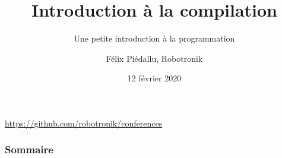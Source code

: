 \documentclass[8pt,a9paper]{beamer}
\title{Introduction à la compilation}
\subtitle{Une petite introduction à la programmation}
\date{12 février 2020}
\author{Félix Piédallu, Robotronik}
\newcommand{\…}{\dots}
\begin{document}
\begin{frame}
  \titlepage
  \begin{center} 
    \url{https://github.com/robotronik/conferences}
  \end{center}
\end{frame}

\begin{frame}
  \frametitle{\textbf{Sommaire}}
  \tableofcontents
\end{frame}




\end{document}

